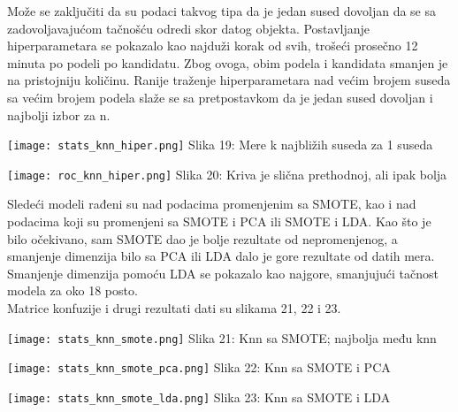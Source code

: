 \documentclass[a4paper]{article}
\begin{document}
{Može se zaključiti da su podaci takvog tipa da je jedan sused dovoljan da se sa zadovoljavajućom tačnošću odredi skor datog objekta. Postavljanje hiperparametara se pokazalo kao najduži korak od svih, trošeći prosečno 12 minuta po podeli po kandidatu. Zbog ovoga, obim podela i kandidata smanjen je na pristojniju količinu. Ranije traženje hiperparametara nad većim brojem suseda sa većim brojem podela slaže se sa pretpostavkom da je jedan sused dovoljan i najbolji izbor za n.\\

\noindent\begin{minipage}{0.4\textwidth}
\texttt{[image: stats\_knn\_hiper.png]}
Slika 19: Mere k najbližih suseda za 1 suseda\\
\end{minipage}
\begin{minipage}{0.6\textwidth}
\texttt{[image: roc\_knn\_hiper.png]}
\hphantom{aa}Slika 20: Kriva je slična prethodnoj, ali ipak bolja\\
\end{minipage}

Sledeći modeli rađeni su nad podacima promenjenim sa SMOTE, kao i nad podacima koji su promenjeni sa SMOTE i PCA ili SMOTE i LDA. Kao što je bilo očekivano, sam SMOTE dao je bolje rezultate od nepromenjenog, a smanjenje dimenzija bilo sa PCA ili LDA dalo je gore rezultate od datih mera. Smanjenje dimenzija pomoću LDA se pokazalo kao najgore, smanjujući tačnost modela za oko 18 posto.\\

Matrice konfuzije i drugi rezultati dati su slikama 21, 22 i 23.\\

\noindent\begin{minipage}{0.35\textwidth}
\texttt{[image: stats\_knn\_smote.png]}
\hphantom{}Slika 21: Knn sa SMOTE; najbolja među knn\\
\end{minipage}
\noindent\begin{minipage}{0.01\textwidth}
\hphantom{a}
\end{minipage}
\begin{minipage}{0.35\textwidth}
\texttt{[image: stats\_knn\_smote\_pca.png]}
\hphantom{}Slika 22: Knn sa SMOTE i PCA\\
\end{minipage}
\noindent\begin{minipage}{0.01\textwidth}
\hphantom{a}
\end{minipage}
\begin{minipage}{0.35\textwidth}
\texttt{[image: stats\_knn\_smote\_lda.png]}
\hphantom{}Slika 23: Knn sa SMOTE i LDA\\
\end{minipage}

}
\end{document}
